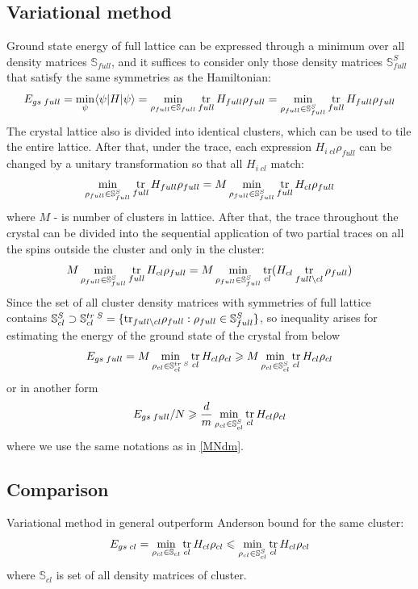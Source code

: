 \documentclass[a4paper]{jpconf}
\renewcommand\[{\begin{equation}}
\renewcommand\]{\end{equation}}
\begin{document}
\subsection{Variational method \cite{Baumgratz,Mazziotti}}
Ground state energy of full lattice can be expressed through a minimum over all density matrices ${\mathbb S}_{full}$, and it suffices to consider only those density matrices ${\mathbb S}_{full}^S$ that satisfy the same symmetries as the Hamiltonian:
\[E_{gs\;full} = \mathop {\min }\limits_\psi  \langle \psi |H|\psi \rangle  = 
\mathop{\min}\limits_{ \rho_{full} \in {\mathbb S}_{full}  } \mathop{\rm{tr}}_{full} H_{full} \rho _{full} = 
\mathop{\min}\limits_{ \rho_{full} \in {\mathbb S}_{full}^S} \mathop{\rm{tr}}_{full} H_{full} \rho _{full}
\]
The crystal lattice also is divided into identical clusters, which can be used to tile the entire lattice.
After that, under the trace, each expression ${H_{i\;cl}}{\rho _{full}}$ can be changed by a unitary transformation 
so that all ${H_{i\;cl}}$ match:
\[
 \mathop{\min}\limits_{ \rho _{full} \in {\mathbb S}_{full}^S} \mathop{\rm{tr}}_{full} H_{full} \rho_{full} = 
M\mathop{\min}\limits_{ \rho _{full} \in {\mathbb S}_{full}^S} \mathop{\rm{tr}}_{full} H_{cl}   \rho_{full}
\]
where $M$ - is number of clusters in lattice.
After that, the trace throughout the crystal can be divided into the sequential application of two partial traces on all the spins outside the cluster and only in the cluster:
\[
M\mathop{\min}\limits_{ \rho _{full} \in {\mathbb S}_{full}^S} \mathop{\rm{tr}}_{full} H_{cl} \rho _{full} = 
M\mathop{\min}\limits_{ \rho _{full} \in {\mathbb S}_{full}^S} \mathop{\rm{tr}}_{cl}
( H_{cl} \mathop{\rm{tr}}_{full\setminus cl} \rho _{full} )\]
Since the set of all cluster density matrices with symmetries of full lattice contains 
${\mathbb S}_{cl}^S \supset {\mathbb S}_{cl}^{tr\;S} = \{ 
{\mathop{\rm{tr}}_{ full \setminus cl}} \rho _{full} : \rho_{full} \in {\mathbb S}_{full}^S
\} $, so inequality arises for estimating the energy of the ground state of the crystal from below
\[E_{gs\;full} = 
M\mathop{\min}\limits_{ \rho _{cl} \in {\mathbb S}_{cl}^{tr\;S}} \mathop{\rm{tr}}_{cl} H_{cl} \rho _{cl} \geqslant
M\mathop{\min}\limits_{ \rho _{cl} \in {\mathbb S}_{cl}^S      } \mathop{\rm{tr}}_{cl} H_{cl} \rho _{cl} \]
or in another form
\[E_{gs\;full}/N\geqslant \frac{d}{m}
 \mathop{\min}\limits_{ \rho _{cl} \in {\mathbb S}_{cl}^S      } \mathop{\rm{tr}}_{cl} H_{cl} \rho _{cl} \]
where we use the same notations as in \eqref{MNdm}.

\subsection{Comparison}
Variational method in general outperform Anderson bound for the same cluster:
\[E_{gs\;cl} = 
 \mathop{\min}\limits_{ \rho _{cl} \in {\mathbb S}_{cl}  } \mathop{\rm{tr}}_{cl} H_{cl} \rho _{cl} \leqslant
 \mathop{\min}\limits_{ \rho _{cl} \in {\mathbb S}_{cl}^S} \mathop{\rm{tr}}_{cl} H_{cl} \rho _{cl} \]
where ${\mathbb S}_{cl}$ is set of all density matrices of cluster.
\end{document}
